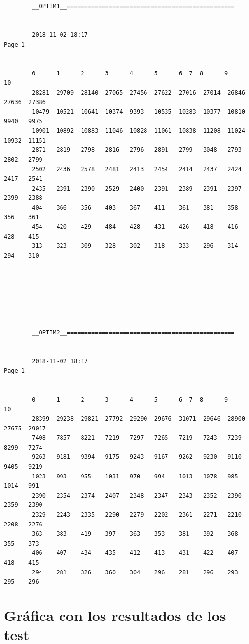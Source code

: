 \begin{lstlisting}[frame=single]
		
		
		
		
		
		
		__OPTIM1__================================================
		
		
		2018-11-02 18:17                                                          Page 1
		
		
		0      1      2	     3	    4	   5	  6	 7	8      9      10
		28281  29709  28140  27065  27456  27622  27016	 27014	26846  27636  27386
		10479  10521  10641  10374  9393   10535  10283	 10377	10810  9940   9975
		10901  10892  10883  11046  10828  11061  10838	 11208	11024  10932  11151
		2871   2819   2798   2816   2796   2891	  2799	 3048	2793   2802   2799
		2502   2436   2578   2481   2413   2454	  2414	 2437	2424   2417   2541
		2435   2391   2390   2529   2400   2391	  2389	 2391	2397   2399   2388
		404    366    356    403    367	   411	  361	 381	358    356    361
		454    420    429    484    428	   431	  426	 418	416    428    415
		313    323    309    328    302	   318	  333	 296	314    294    310
		
		
		
		
		
		
		
		__OPTIM2__================================================
		
		
		2018-11-02 18:17                                                          Page 1
		
		
		0      1      2	     3	    4	   5	  6	 7	8      9      10
		28399  29238  29821  27792  29290  29676  31071	 29646	28900  27675  29017
		7408   7857   8221   7219   7297   7265	  7219	 7243	7239   8299   7274
		9263   9181   9394   9175   9243   9167	  9262	 9230	9110   9405   9219
		1023   993    955    1031   970	   994	  1013	 1078	985    1014   991
		2390   2354   2374   2407   2348   2347	  2343	 2352	2390   2359   2390
		2329   2243   2335   2290   2279   2202	  2361	 2271	2210   2208   2276
		363    383    419    397    363	   353	  381	 392	368    355    373
		406    407    434    435    412	   413	  431	 422	407    418    415
		294    281    326    360    304	   296	  281	 296	293    295    296	
	\end{lstlisting}


	\section[Grafica con los resultados de los test]{Gráfica con los resultados de los test}

